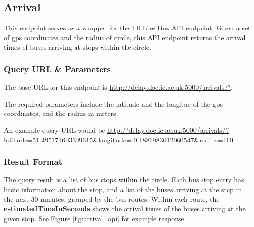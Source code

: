 \subsection{Arrival}
\par This endpoint serves as a wrapper for the Tfl Live Bus API endpoint. Given a set of \acrfull{gps} coordinates and the radius of circle, this API endpoint returns the arrival times of buses arriving at stops within the circle.

\subsubsection{Query URL \& Parameters}
\par The base URL for this endpoint is \url{http://delay.doc.ic.ac.uk:5000/arrivals/?}.

\par The required parameters include the latitude and the longitue of the \acrshort{gps} coordinates, and the radius in meters.

\par An example query URL would be \url{http://delay.doc.ic.ac.uk:5000/arrivals/?latitude=51.495171603309615&longitude=-0.1883983612060547&radius=100}.

\subsubsection{Result Format}
\par The query result is a list of bus stops within the circle. Each bus stop entry has basic information about the stop, and a list of the buses arriving at the stop in the next 30 minutes, grouped by the bus routes. Within each route, the \textbf{estimatedTimeInSeconds} shows the arrival times of the buses arriving at the given stop. See Figure \ref{fig:arrival_api} for example response.


